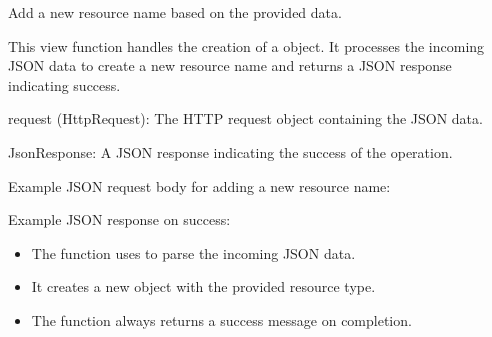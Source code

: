 \documentclass[letterpaper,10pt,english]{sphinxmanual}
\begin{document}
\begin{fulllineitems}
\label{\detokenize{app:app.views.update_name}}
\pysigstartsignatures
{}
\pysigstopsignatures
\sphinxAtStartPar
Add a new resource name based on the provided data.

\sphinxAtStartPar
This view function handles the creation of a  object. 
It processes the incoming JSON data to create a new resource name and 
returns a JSON response indicating success.
\begin{description}
\sphinxAtStartPar
request (HttpRequest): The HTTP request object containing the JSON data.

\sphinxAtStartPar
JsonResponse: A JSON response indicating the success of the operation.

\sphinxAtStartPar
Example JSON request body for adding a new resource name:

\begin{sphinxVerbatim}[commandchars=\\\{\}]
\end{sphinxVerbatim}

\sphinxAtStartPar
Example JSON response on success:

\begin{sphinxVerbatim}[commandchars=\\\{\}]
\end{sphinxVerbatim}

\begin{itemize}
\item {} 
\sphinxAtStartPar
The function uses  to parse the incoming JSON data.

\item {} 
\sphinxAtStartPar
It creates a new  object with the provided resource type.

\item {} 
\sphinxAtStartPar
The function always returns a success message on completion.

\end{itemize}

\end{description}

\end{fulllineitems}
\end{document}
